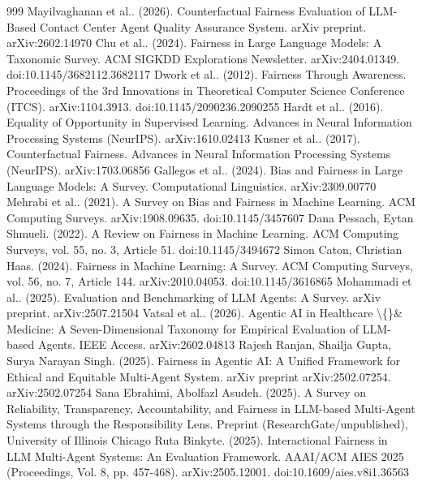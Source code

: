 \documentclass[10pt]{article}
\begin{document}
\begin{thebibliography}{999}
 Mayilvaghanan et al.. (2026). Counterfactual Fairness Evaluation of LLM-Based Contact Center Agent Quality Assurance System. arXiv preprint. arXiv:2602.14970
 Chu et al.. (2024). Fairness in Large Language Models: A Taxonomic Survey. ACM SIGKDD Explorations Newsletter. arXiv:2404.01349. doi:10.1145/3682112.3682117
 Dwork et al.. (2012). Fairness Through Awareness. Proceedings of the 3rd Innovations in Theoretical Computer Science Conference (ITCS). arXiv:1104.3913. doi:10.1145/2090236.2090255
 Hardt et al.. (2016). Equality of Opportunity in Supervised Learning. Advances in Neural Information Processing Systems (NeurIPS). arXiv:1610.02413
 Kusner et al.. (2017). Counterfactual Fairness. Advances in Neural Information Processing Systems (NeurIPS). arXiv:1703.06856
 Gallegos et al.. (2024). Bias and Fairness in Large Language Models: A Survey. Computational Linguistics. arXiv:2309.00770
 Mehrabi et al.. (2021). A Survey on Bias and Fairness in Machine Learning. ACM Computing Surveys. arXiv:1908.09635. doi:10.1145/3457607
 Dana Pessach, Eytan Shmueli. (2022). A Review on Fairness in Machine Learning. ACM Computing Surveys, vol. 55, no. 3, Article 51. doi:10.1145/3494672
 Simon Caton, Christian Haas. (2024). Fairness in Machine Learning: A Survey. ACM Computing Surveys, vol. 56, no. 7, Article 144. arXiv:2010.04053. doi:10.1145/3616865
 Mohammadi et al.. (2025). Evaluation and Benchmarking of LLM Agents: A Survey. arXiv preprint. arXiv:2507.21504
 Vatsal et al.. (2026). Agentic AI in Healthcare \textbackslash\{\}\& Medicine: A Seven-Dimensional Taxonomy for Empirical Evaluation of LLM-based Agents. IEEE Access. arXiv:2602.04813
 Rajesh Ranjan, Shailja Gupta, Surya Narayan Singh. (2025). Fairness in Agentic AI: A Unified Framework for Ethical and Equitable Multi-Agent System. arXiv preprint arXiv:2502.07254. arXiv:2502.07254
 Sana Ebrahimi, Abolfazl Asudeh. (2025). A Survey on Reliability, Transparency, Accountability, and Fairness in LLM-based Multi-Agent Systems through the Responsibility Lens. Preprint (ResearchGate/unpublished), University of Illinois Chicago
 Ruta Binkyte. (2025). Interactional Fairness in LLM Multi-Agent Systems: An Evaluation Framework. AAAI/ACM AIES 2025 (Proceedings, Vol. 8, pp. 457-468). arXiv:2505.12001. doi:10.1609/aies.v8i1.36563

\end{thebibliography}
\end{document}
